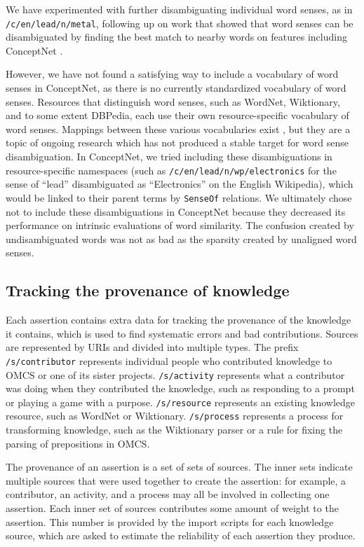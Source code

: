 \documentclass[letterpaper]{article}
\begin{document}
We have experimented with further disambiguating individual word senses,
as in \texttt{/c/en/lead/n/metal}, following up on work that showed that
word senses can be disambiguated by finding the best match to nearby
words on features including ConceptNet \cite{havasi2010coarse}.

However, we have not found a satisfying way to include a vocabulary of
word senses in ConceptNet, as there is no currently standardized
vocabulary of word senses. Resources that distinguish word senses, such
as WordNet, Wiktionary, and to some extent DBPedia, each use their own
resource-specific vocabulary of word senses. Mappings between these
various vocabularies exist \cite{miller2014alignment}, but they are a
topic of ongoing research which has not produced a stable target for
word sense disambiguation. In ConceptNet, we tried including these
disambiguations in resource-specific namespaces (such as
\texttt{/c/en/lead/n/wp/electronics} for the sense of ``lead''
disambiguated as ``Electronics'' on the English Wikipedia), which would
be linked to their parent terms by \texttt{SenseOf} relations. We
ultimately chose not to include these disambiguations in ConceptNet
because they decreased its performance on intrinsic evaluations of word
similarity. The confusion created by undisambiguated words was not as
bad as the sparsity created by unaligned word senses.


\subsection{Tracking the provenance of knowledge}\label{provenance}

Each assertion contains extra data for tracking the provenance of the
knowledge it contains, which is used to find systematic errors and bad
contributions. Sources are represented by URIs and divided into multiple
types. The prefix \texttt{/s/contributor} represents individual people
who contributed knowledge to OMCS or one of its sister projects.
\texttt{/s/activity} represents what a contributor was doing when they
contributed the knowledge, such as responding to a prompt or playing a
game with a purpose. \texttt{/s/resource} represents an existing
knowledge resource, such as WordNet or Wiktionary. \texttt{/s/process}
represents a process for transforming knowledge, such as the Wiktionary
parser or a rule for fixing the parsing of prepositions in OMCS.

The provenance of an assertion is a set of sets of sources. The inner
sets indicate multiple sources that were used together to create the
assertion: for example, a contributor, an activity, and a process may
all be involved in collecting one assertion. Each inner set of sources
contributes some amount of weight to the assertion. This number is
provided by the import scripts for each knowledge source, which are
asked to estimate the reliability of each assertion they produce.
\end{document}
